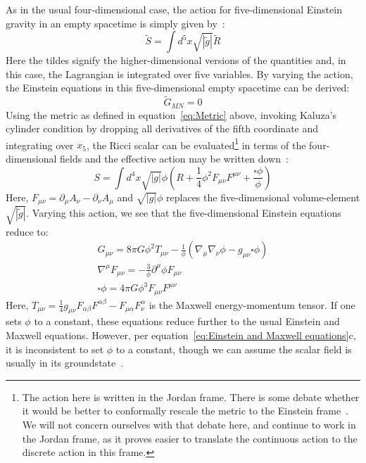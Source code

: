 \documentclass[a4paper,12pt]{article}
\numberwithin{equation}{section}
\begin{document}
As in the usual four-dimensional case, the action for five-dimensional Einstein gravity in an empty spacetime is simply given by~\cite{Bailin1987}:
\begin{equation}
\label{eq:Five-dimensional action}
\tilde{S}=\int d^5x\sqrt{|\tilde{g}|}\tilde{R}
\end{equation}
Here the tildes signify the higher-dimensional versions of the quantities and, in this case, the Lagrangian is integrated over five variables. By varying the action, the Einstein equations in this five-dimensional empty spacetime can be derived:
\begin{equation}
\label{eq:Einstein equations}
\tilde{G}_{MN}=0
\end{equation}
Using the metric as defined in equation~\ref{eq:Metric} above, invoking Kaluza's cylinder condition by dropping all derivatives of the fifth coordinate and integrating over $x_5$, the Ricci scalar can be evaluated\footnote{The action here is written in the Jordan frame. There is some debate whether it would be better to conformally rescale the metric to the Einstein frame~\cite{Overduin1997}. We will not concern ourselves with that debate here, and continue to work in the Jordan frame, as it proves easier to translate the continuous action to the discrete action in this frame.} in terms of the four-dimensional fields and the effective action may be written down~\cite{Zee2013}:
\begin{equation}
\label{eq:Four-dimensional action}
S=\int d^4x\sqrt{|g|}\phi (R+\frac{1}{4} \phi^2 F_{\mu \nu } F^{\mu \nu}+\frac{\square \phi}{\phi})
\end{equation}
Here, $F_{\mu \nu }=\partial_{\mu} A_{\nu}-\partial_\nu A_{\mu }$ and $\sqrt{|g|}\phi$ replaces the five-dimensional volume-element $\sqrt{|\tilde{g}|}$. Varying this action, we see that the five-dimensional Einstein equations reduce to:
\begin{subequations}
\label{eq:Einstein and Maxwell equations}
\begin{gather}
G_{\mu\nu}=8\pi G\phi^2 T_{\mu \nu}-\frac{1}{\phi}(\nabla_\mu \nabla_\nu \phi -g_{\mu \nu} \square \phi)\\
\nabla^\mu F_{\mu \nu}=-\frac{3}{\phi} \partial^\mu \phi F_{\mu \nu}\\
\square \phi= 4\pi G \phi^3 F_{\mu \nu}F^{\mu \nu}
\end{gather}
\end{subequations}
Here, $T_{\mu \nu} = \frac{1}{4} g_{\mu \nu} F_{\alpha\beta} F^{\alpha \beta}-F_{\mu \alpha}F_{\nu}^{\alpha}$ is the Maxwell energy-momentum tensor. If one sets $\phi$ to a constant, these equations reduce further to the usual Einstein and Maxwell equations. However, per equation~\ref{eq:Einstein and Maxwell equations}c, it is inconsistent to set $\phi$ to a constant, though we can assume the scalar field is usually in its groundstate~\cite{Pope2000}.
\end{document}
